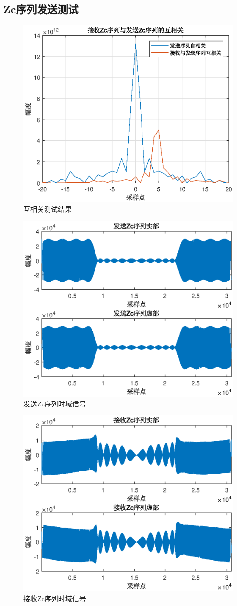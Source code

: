 \documentclass{article}
\begin{document}
\subsection{Zc序列发送测试}
\begin{figure}[H]
	\centering
	\includegraphics[width = .8\textwidth]{zcco.eps}
	\caption{互相关测试结果}
\end{figure}
\begin{figure}[H]
	\centering
	\includegraphics[width = .8\textwidth]{zctx.eps}
	\caption{发送Zc序列时域信号}
\end{figure}
\begin{figure}[H]
	\centering
	\includegraphics[width = .8\textwidth]{zcrx.eps}
	\caption{接收Zc序列时域信号}
\end{figure}
\end{document}
